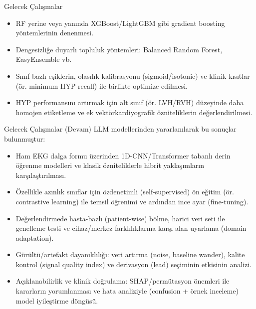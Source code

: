 \documentclass[aspectratio=169]{beamer}
\begin{document}
\begin{frame}{Gelecek Çalışmalar}
	\begin{itemize}
		\item RF yerine veya yanında XGBoost/LightGBM gibi gradient boosting yöntemlerinin denenmesi.
		\item Dengesizliğe duyarlı topluluk yöntemleri: Balanced Random Forest, EasyEnsemble vb.
		\item Sınıf bazlı eşiklerin, olasılık kalibrasyonu (sigmoid/isotonic) ve klinik kısıtlar (ör. minimum HYP recall) ile birlikte optimize edilmesi.
		\item HYP performansını artırmak için alt sınıf (ör. LVH/RVH) düzeyinde daha homojen etiketleme ve ek vektörkardiyografik özniteliklerin değerlendirilmesi.
	\end{itemize}
\end{frame}
\begin{frame}{Gelecek Çalışmalar (Devam)}
		LLM modellerinden yararlanılarak bu sonuçlar bulunmuştur:

	\begin{itemize}
		\item Ham EKG dalga formu üzerinden 1D-CNN/Transformer tabanlı derin öğrenme modelleri ve klasik özniteliklerle hibrit yaklaşımların karşılaştırılması.
		\item Özellikle azınlık sınıflar için özdenetimli (self-supervised) ön eğitim (ör. contrastive learning) ile temsil öğrenimi ve ardından ince ayar (fine-tuning).
		\item Değerlendirmede hasta-bazlı (patient-wise) bölme, harici veri seti ile genelleme testi ve cihaz/merkez farklılıklarına karşı alan uyarlama (domain adaptation).
		\item Gürültü/artefakt dayanıklılığı: veri artırma (noise, baseline wander), kalite kontrol (signal quality index) ve derivasyon (lead) seçiminin etkisinin analizi.
		\item Açıklanabilirlik ve klinik doğrulama: SHAP/permütasyon önemleri ile kararların yorumlanması ve hata analiziyle (confusion + örnek inceleme) model iyileştirme döngüsü.
	\end{itemize}
\end{frame}
\end{document}
